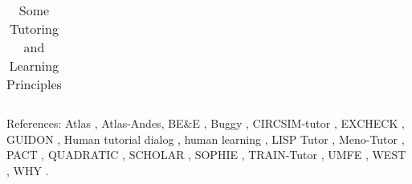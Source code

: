 \documentclass{llncs}
\begin{document}
\begin{table}
\begin{center}
\begin{scriptsize}
\begin{tabular}{|l||l |l |}
\end{tabular}
\end{scriptsize}
\caption{Some Tutoring and Learning Principles}
\label{summary}
\end{center}
\setlength{\baselineskip}{1.0em}
\vspace*{-0.7em}
\begin{footnotesize} 
References:
Atlas \cite{VanLehn00}, Atlas-Andes\cite{Rose01}, 
BE\&E \cite{Core00}, Buggy \cite{buggy78}, 
CIRCSIM-tutor \cite{circsim},
EXCHECK \cite{McDonald81},
GUIDON \cite{Clancey87}, 
Human tutorial dialog \cite{Fox93}, 
human learning \cite{Merrill92,Gentner01,Kulik88,Ausubel68,Collins82,Festinger57}, 
LISP Tutor \cite{Anderson89}, Meno-Tutor \cite{woolf84}, 
PACT \cite{Aleven00}, QUADRATIC \cite{quadratic},
SCHOLAR \cite{Carbonell70}, SOPHIE \cite{Brown82}, TRAIN-Tutor \cite{WoolfA00}, 
UMFE \cite{Sleeman84},
WEST \cite{Burton79}, WHY \cite{why77}.
\setlength{\baselineskip}{1.5em}
\end{footnotesize}
\end{table}
\vspace*{-1.0em}
\end{document}
